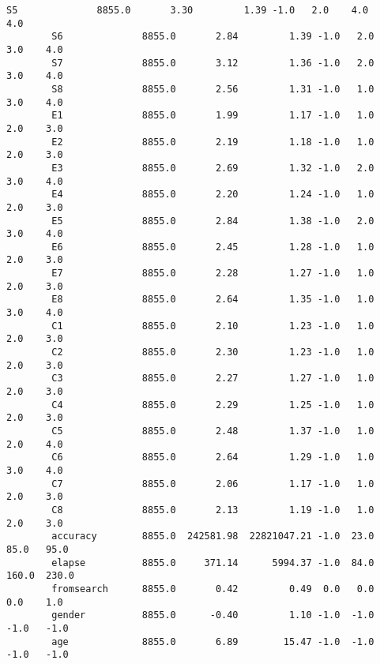 \documentclass[11pt]{article}
\begin{document}
\begin{Verbatim}[commandchars=\\\{\}]
        S5              8855.0       3.30         1.39 -1.0   2.0    4.0    4.0   
        S6              8855.0       2.84         1.39 -1.0   2.0    3.0    4.0   
        S7              8855.0       3.12         1.36 -1.0   2.0    3.0    4.0   
        S8              8855.0       2.56         1.31 -1.0   1.0    3.0    4.0   
        E1              8855.0       1.99         1.17 -1.0   1.0    2.0    3.0   
        E2              8855.0       2.19         1.18 -1.0   1.0    2.0    3.0   
        E3              8855.0       2.69         1.32 -1.0   2.0    3.0    4.0   
        E4              8855.0       2.20         1.24 -1.0   1.0    2.0    3.0   
        E5              8855.0       2.84         1.38 -1.0   2.0    3.0    4.0   
        E6              8855.0       2.45         1.28 -1.0   1.0    2.0    3.0   
        E7              8855.0       2.28         1.27 -1.0   1.0    2.0    3.0   
        E8              8855.0       2.64         1.35 -1.0   1.0    3.0    4.0   
        C1              8855.0       2.10         1.23 -1.0   1.0    2.0    3.0   
        C2              8855.0       2.30         1.23 -1.0   1.0    2.0    3.0   
        C3              8855.0       2.27         1.27 -1.0   1.0    2.0    3.0   
        C4              8855.0       2.29         1.25 -1.0   1.0    2.0    3.0   
        C5              8855.0       2.48         1.37 -1.0   1.0    2.0    4.0   
        C6              8855.0       2.64         1.29 -1.0   1.0    3.0    4.0   
        C7              8855.0       2.06         1.17 -1.0   1.0    2.0    3.0   
        C8              8855.0       2.13         1.19 -1.0   1.0    2.0    3.0   
        accuracy        8855.0  242581.98  22821047.21 -1.0  23.0   85.0   95.0   
        elapse          8855.0     371.14      5994.37 -1.0  84.0  160.0  230.0   
        fromsearch      8855.0       0.42         0.49  0.0   0.0    0.0    1.0   
        gender          8855.0      -0.40         1.10 -1.0  -1.0   -1.0   -1.0   
        age             8855.0       6.89        15.47 -1.0  -1.0   -1.0   -1.0   
        

\end{Verbatim}
\end{document}
